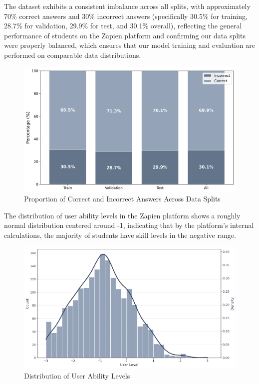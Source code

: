 \documentclass[
    a4paper, %
    10pt, %
    twoside, %
]{LTJournalArticle}
\begin{document}
The dataset exhibits a consistent imbalance across all splits, with approximately 70\% correct answers and 30\% incorrect answers (specifically 30.5\% for training, 28.7\% for validation, 29.9\% for test, and 30.1\% overall), reflecting the general performance of students on the Zapien platform and confirming our data splits were properly balanced, which ensures that our model training and evaluation are performed on comparable data distributions.

\begin{figure}[H]
    \centering
    \includegraphics[width=\columnwidth]{../one_model_experiment/figures/is_correct_distribution.png}
    \caption{Proportion of Correct and Incorrect Answers Across Data Splits}
    \label{fig:correct-incorrect-dist}
\end{figure}

The distribution of user ability levels in the Zapien platform shows a roughly normal distribution centered around -1, indicating that by the platform's internal calculations, the majority of students have skill levels in the negative range.

\begin{figure}[H]
    \centering
    \includegraphics[width=\columnwidth]{../one_model_experiment/figures/user_level_distribution.png}
    \caption{Distribution of User Ability Levels}
    \label{fig:user-level-dist}
\end{figure}
\end{document}
